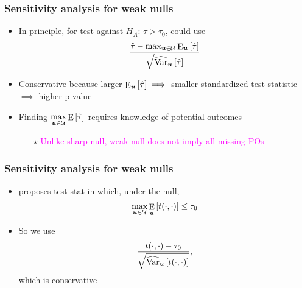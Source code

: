 \documentclass[table, xcolor = {dvipsnames}, 9pt]{beamer}
\theoremstyle{plain}
\DeclareMathOperator{\E}{\rm{E}}
\DeclareMathOperator{\Var}{\rm{Var}}
\begin{document}
\begin{frame}[t]
\frametitle{Sensitivity analysis for weak nulls} 
\vfill
\begin{itemize} \vfill
\item In principle, for test against $H_A: \, \tau > \tau_0$, could use
\begin{equation}
\dfrac{\hat{\tau} - \max_{\bm{u} \in \mathcal{U}} \E_{\bm{u}}\left[\hat{\tau}\right]}{\sqrt{\widehat{\Var}_{\bm{u}}\left[\hat{\tau}\right]}}
\end{equation} \vfill
\item Conservative because larger $\E_{\bm{u}}\left[\hat{\tau}\right] \implies $ smaller standardized test statistic $\implies$ higher p-value \vfill
\item Finding $\max \limits_{\bm{u} \in \mathcal{U}} \E\left[\hat{\tau}\right]$ requires knowledge of potential outcomes \vfill
\begin{itemize} \vfill
\item[$\star$] \textcolor{magenta}{Unlike sharp null, weak null does not imply all missing POs} \vfill
\end{itemize} \vfill
\end{itemize} \vfill
\vfill
\end{frame}
\begin{frame}[t]
\frametitle{Sensitivity analysis for weak nulls} 
\vfill
\begin{itemize} \vfill
\item \citet{fogarty2023} proposes test-stat in which, under the null,
\begin{equation*}
\max \limits_{\bm{u} \in \mathcal{U}} \E_{\bm{u}}\left[t(\cdot, \cdot)\right] \leq \tau_0
\end{equation*} \vfill
\item So we use
\begin{equation}
\dfrac{t(\cdot, \cdot) - \tau_0}{\sqrt{\widehat{\Var}_{\bm{u}}\left[t(\cdot, \cdot)\right]}},
\end{equation} \vfill
which is conservative \vfill
\end{itemize}  
\vfill
\end{frame}
\end{document}
